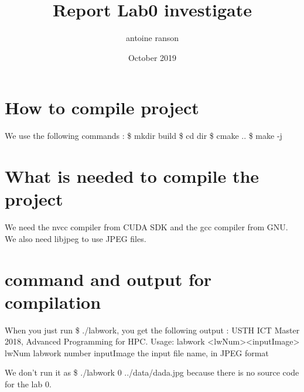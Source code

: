 \documentclass{article}
\title{Report Lab0 investigate}
\author{antoine ranson }
\date{October 2019}
\begin{document}
 
\maketitle 

\section{How to compile project} 

We use the following commands : \newline 
\$ mkdir build \newline 
\$ cd dir\newline 
\$ cmake ..\newline 
\$ make -j\newline 

\section{What is needed to compile the project} 

We need the nvcc compiler from CUDA SDK and the gcc compiler from GNU. We also 
need libjpeg to use JPEG files.\newline 

\section{command and output for compilation} 

When you just run \$ ./labwork, you get the following output : \newline\newline 
USTH ICT Master 2018, Advanced Programming for HPC.\newline 
Usage: labwork  \textless lwNum\textgreater  \textless inputImage\textgreater \newline
   lwNum labwork number \newline
   inputImage the input file name, in JPEG format \newline
   
   We don't run it as \$ ./labwork 0 ../data/dada.jpg because there is no source code for the lab 0.
   
\end{document}
